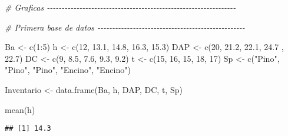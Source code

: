\documentclass[
]{article}
\newenvironment{Shaded}{\begin{snugshade}}{\end{snugshade}}
\newcommand{\CommentTok}[1]{\textcolor[rgb]{0.56,0.35,0.01}{\textit{#1}}}
\newcommand{\DecValTok}[1]{\textcolor[rgb]{0.00,0.00,0.81}{#1}}
\newcommand{\FloatTok}[1]{\textcolor[rgb]{0.00,0.00,0.81}{#1}}
\newcommand{\FunctionTok}[1]{\textcolor[rgb]{0.00,0.00,0.00}{#1}}
\newcommand{\NormalTok}[1]{#1}
\newcommand{\OtherTok}[1]{\textcolor[rgb]{0.56,0.35,0.01}{#1}}
\newcommand{\SpecialCharTok}[1]{\textcolor[rgb]{0.00,0.00,0.00}{#1}}
\newcommand{\StringTok}[1]{\textcolor[rgb]{0.31,0.60,0.02}{#1}}
\begin{document}
\begin{Shaded}
\begin{Highlighting}[]
\CommentTok{\# Graficas {-}{-}{-}{-}{-}{-}{-}{-}{-}{-}{-}{-}{-}{-}{-}{-}{-}{-}{-}{-}{-}{-}{-}{-}{-}{-}{-}{-}{-}{-}{-}{-}{-}{-}{-}{-}{-}{-}{-}{-}{-}{-}{-}{-}{-}{-}{-}{-}{-}{-}{-}{-}{-}{-}{-}{-}{-}{-}{-}{-}{-}{-}{-}{-}}


\CommentTok{\# Primera base de datos  {-}{-}{-}{-}{-}{-}{-}{-}{-}{-}{-}{-}{-}{-}{-}{-}{-}{-}{-}{-}{-}{-}{-}{-}{-}{-}{-}{-}{-}{-}{-}{-}{-}{-}{-}{-}{-}{-}{-}{-}{-}{-}{-}{-}{-}{-}{-}{-}{-}{-}}

\NormalTok{Ba }\OtherTok{\textless{}{-}} \FunctionTok{c}\NormalTok{(}\DecValTok{1}\SpecialCharTok{:}\DecValTok{5}\NormalTok{)}
\NormalTok{h }\OtherTok{\textless{}{-}} \FunctionTok{c}\NormalTok{(}\DecValTok{12}\NormalTok{, }\FloatTok{13.1}\NormalTok{, }\FloatTok{14.8}\NormalTok{, }\FloatTok{16.3}\NormalTok{, }\FloatTok{15.3}\NormalTok{)}
\NormalTok{DAP }\OtherTok{\textless{}{-}} \FunctionTok{c}\NormalTok{(}\DecValTok{20}\NormalTok{, }\FloatTok{21.2}\NormalTok{, }\FloatTok{22.1}\NormalTok{, }\FloatTok{24.7}\NormalTok{ , }\FloatTok{22.7}\NormalTok{)}
\NormalTok{DC }\OtherTok{\textless{}{-}} \FunctionTok{c}\NormalTok{(}\DecValTok{9}\NormalTok{, }\FloatTok{8.5}\NormalTok{, }\FloatTok{7.6}\NormalTok{, }\FloatTok{9.3}\NormalTok{, }\FloatTok{9.2}\NormalTok{)}
\NormalTok{t }\OtherTok{\textless{}{-}} \FunctionTok{c}\NormalTok{(}\DecValTok{15}\NormalTok{, }\DecValTok{16}\NormalTok{, }\DecValTok{15}\NormalTok{, }\DecValTok{18}\NormalTok{, }\DecValTok{17}\NormalTok{)}
\NormalTok{Sp }\OtherTok{\textless{}{-}} \FunctionTok{c}\NormalTok{(}\StringTok{"Pino"}\NormalTok{, }\StringTok{"Pino"}\NormalTok{, }\StringTok{"Pino"}\NormalTok{, }\StringTok{"Encino"}\NormalTok{, }\StringTok{"Encino"}\NormalTok{)}

\NormalTok{Inventario }\OtherTok{\textless{}{-}} \FunctionTok{data.frame}\NormalTok{(Ba, h, DAP, DC, t, Sp)}

\FunctionTok{mean}\NormalTok{(h)}
\end{Highlighting}
\end{Shaded}

\begin{verbatim}
## [1] 14.3
\end{verbatim}

\begin{Shaded}
\end{Shaded}
\end{document}

